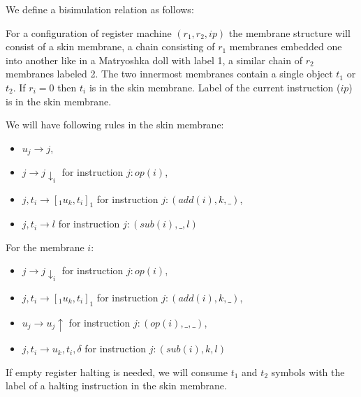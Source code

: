 \documentclass[llncs,submission,copyright,creativecommons]{../lib/lncs/llncs}
\begin{document}
We define a bisimulation relation as follows:

For a configuration of register machine $(r_1, r_2, ip)$ the membrane structure will consist of a skin membrane, a chain consisting of $r_1$ membranes embedded one into another like in a Matryoshka doll with label 1, a similar chain of $r_2$ membranes labeled 2. The two innermost membranes contain a single object $t_1$ or $t_2$. If $r_i = 0$ then $t_i$ is in the skin membrane. Label of the current instruction ($ip$) is in the skin membrane.

We will have following rules in the skin membrane:
\begin{itemize}
  \item $u_j \rightarrow j$,
  \item $j \rightarrow j\downarrow_{i}$ for instruction $j: op(i)$,
  \item $j, t_i \rightarrow [_1 u_k, t_i ]_1$ for instruction $j: (add(i), k, \_)$,
  \item $j, t_i \rightarrow l$ for instruction $j: (sub(i), \_, l)$
\end{itemize}

For the membrane $i$:
\begin{itemize}
  \item $j \rightarrow j\downarrow_{i}$ for instruction $j: op(i)$,
  \item $j, t_i \rightarrow [_1 u_k, t_i ]_1$ for instruction $j: (add(i), k, \_)$,
  \item $u_j \rightarrow u_j\uparrow$ for instruction $j: (op(i), \_, \_)$,
  \item $j, t_i \rightarrow u_k, t_i, \delta$ for instruction $j: (sub(i), k, l)$
\end{itemize}

If empty register halting is needed, we will consume $t_1$ and $t_2$ symbols with the label of a halting instruction in the skin membrane.
\end{document}
